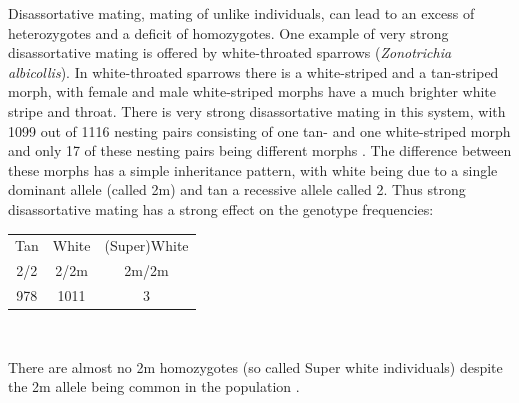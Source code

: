 {{Disassortative mating, mating of unlike individuals, can lead to
an excess of heterozygotes and a deficit of homozygotes.
One example of very strong disassortative mating is offered by
white-throated sparrows ({\it Zonotrichia albicollis}). 
In white-throated sparrows there is a white-striped and a tan-striped
morph, with female and male white-striped morphs have a much brighter white stripe
and throat. There is very strong disassortative mating in this system, with 1099
out of 1116 nesting pairs consisting of one tan- and one white-striped
morph and only 17 of these
nesting pairs being different morphs \citep{tuttle2016divergence}. The
difference between these morphs has a simple inheritance pattern, with
white being due to a single dominant allele (called 2m) and tan a recessive allele called
2. Thus strong disassortative mating has a strong effect on the
genotype frequencies:  \\
\begin{center}
\begin{tabular}{ccc}
  Tan & White & (Super)White \\
2/2  & 2/2m   & 2m/2m \\
978    & 1011 & 3 \\
\end{tabular}\\
\end{center}
There are almost no 2m homozygotes (so called Super
white individuals)
despite the 2m allele being common in the population \citep[data from
][ table S1]{tuttle2016divergence}.

}}
